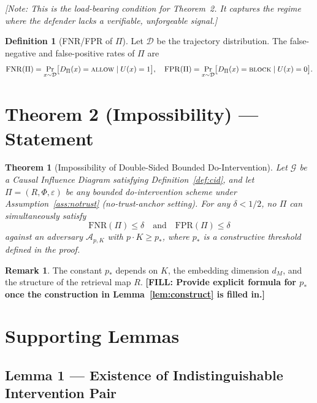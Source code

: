 \documentclass[11pt]{article}
\newcommand{\TODO}[1]{{\color{red}\textbf{[FILL: #1]}}}
\newcommand{\NOTE}[1]{{\color{blue}\textit{[Note: #1]}}}
\theoremstyle{plain}
\newtheorem{theorem}{Theorem}
\theoremstyle{definition}
\newtheorem{definition}{Definition}
\newtheorem{remark}{Remark}
\begin{document}
\NOTE{This is the load-bearing condition for Theorem~2. It captures
the regime where the defender lacks a verifiable, unforgeable signal.}

\begin{definition}[FNR/FPR of $\Pi$]\label{def:fnrfpr}
Let $\mathcal{D}$ be the trajectory distribution. The false-negative and
false-positive rates of $\Pi$ are
\[
  \mathrm{FNR}(\Pi) = \Pr_{x\sim\mathcal{D}}\bigl[D_\Pi(x) = \textsc{allow} \mid U(x) = 1\bigr],
\quad
  \mathrm{FPR}(\Pi) = \Pr_{x\sim\mathcal{D}}\bigl[D_\Pi(x) = \textsc{block} \mid U(x) = 0\bigr].
\]
\end{definition}

\section{Theorem 2 (Impossibility) --- Statement}

\begin{theorem}[Impossibility of Double-Sided Bounded Do-Intervention]\label{thm:impossibility}
Let $\mathcal{G}$ be a Causal Influence Diagram satisfying Definition~\ref{def:cid},
and let $\Pi = (R, \Phi, \varepsilon)$ be any bounded do-intervention scheme
under Assumption~\ref{ass:notrust} (no-trust-anchor setting).
For any $\delta < 1/2$, no $\Pi$ can simultaneously satisfy
\[
  \mathrm{FNR}(\Pi) \le \delta \quad \text{and} \quad \mathrm{FPR}(\Pi) \le \delta
\]
against an adversary $\mathcal{A}_{p, K}$ with $p \cdot K \ge p_*$,
where $p_*$ is a constructive threshold defined in the proof.
\end{theorem}

\begin{remark}
The constant $p_*$ depends on $K$, the embedding dimension $d_M$,
and the structure of the retrieval map $R$. \TODO{Provide explicit
formula for $p_*$ once the construction in Lemma~\ref{lem:construct} is filled in.}
\end{remark}

\section{Supporting Lemmas}

\subsection{Lemma 1 --- Existence of Indistinguishable Intervention Pair}
\end{document}
